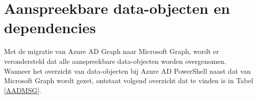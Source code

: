 









\section{Aanspreekbare data-objecten en dependencies}




Met de migratie van Azure \ac{AD} Graph naar Microsoft Graph, wordt er verondersteld dat alle aanspreekbare data-objecten worden overgenomen. Wanneer het overzicht van data-objecten bij Azure \ac{AD} PowerShell naast dat van Microsoft Graph wordt gezet, ontstaat volgend overzicht dat te vinden is in Tabel \ref{AADMSG}. \\


